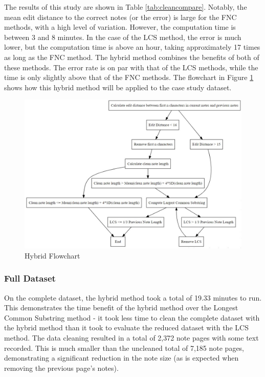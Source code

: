 \documentclass[print]{nuthesis}
\begin{document}
The results of this study are shown in Table \ref{tab:cleancompare}.
Notably, the mean edit distance to the correct notes (or the error) is large for the FNC methods, with a high level of variation.
However, the computation time is between 3 and 8 minutes.
In the case of the LCS method, the error is much lower, but the computation time is above an hour, taking approximately 17 times as long as the FNC method.
The hybrid method combines the benefits of both of these methods.
The error rate is on par with that of the LCS methods, while the time is only slightly above that of the FNC methods.
The flowchart in Figure \ref{fig:flowchart} shows how this hybrid method will be applied to the case study dataset.

\begin{figure}

{\centering \includegraphics[width=\linewidth]{images/flowchart} 

}

\caption{Hybrid Flowchart}\label{fig:flowchart}
\end{figure}

\hypertarget{full-dataset}{%
\subsubsection{Full Dataset}\label{full-dataset}}

On the complete dataset, the hybrid method took a total of 19.33 minutes to run.
This demonstrates the time benefit of the hybrid method over the Longest Common Substring method - it took less time to clean the complete dataset with the hybrid method than it took to evaluate the reduced dataset with the LCS method.
The data cleaning resulted in a total of 2,372 note pages with some text recorded.
This is much smaller than the uncleaned total of 7,185 note pages, demonstrating a significant reduction in the note size (as is expected when removing the previous page's notes).
\end{document}
